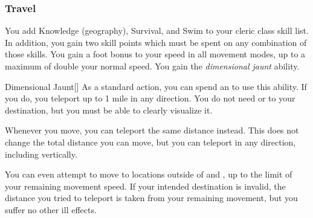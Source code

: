         \subsubsection{Travel}
             You add Knowledge (geography), Survival, and Swim to your cleric class skill list.
            In addition, you gain two skill points which must be spent on any combination of those skills.
             You gain a  foot bonus to your speed in all movement modes, up to a maximum of double your normal speed.
             You gain the \textit{dimensional jaunt} ability.
            \begin{ability}{Dimensional Jaunt}[]
                As a standard action, you can spend an  to use this ability.
                If you do, you teleport up to 1 mile in any direction.
                You do not need  or  to your destination, but you must be able to clearly visualize it.
            \end{ability}
             Whenever you move, you can teleport the same distance instead.
            This does not change the total distance you can move, but you can teleport in any direction, including vertically.

            You can even attempt to move to locations outside of  and , up to the limit of your remaining movement speed.
            If your intended destination is invalid, the distance you tried to teleport is taken from your remaining movement, but you suffer no other ill effects.

